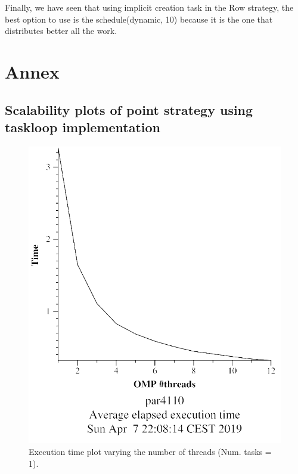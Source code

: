 \documentclass[12pt, a4paper]{article}
\begin{document}
Finally, we have seen that using implicit creation task in the Row strategy, the best option to use is the schedule(dynamic, 10) because it is the one that distributes better all the work.


\newpage

\section{Annex}

\subsection{Scalability plots of point strategy using taskloop implementation}
\label{sec:point_taskloop_scalability_plots}
\begin{figure}[H]
\centering
\begin{minipage}[b]{0.4\linewidth}
  \centering
  \includegraphics[scale=0.5]{./mandel-omp-10000-strong-omp-24-1-time}
  \caption{Execution time plot varying the number of threads (Num. tasks = 1).}
  \label{fig:mandel-omp-10000-strong-omp-24-1-time}
\end{minipage}%

\end{figure}
\end{document}
